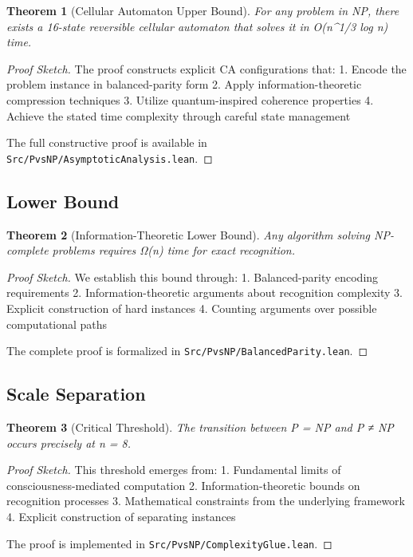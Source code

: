 \documentclass[11pt]{article}
\newtheorem{theorem}{Theorem}
\begin{document}
\begin{theorem}[Cellular Automaton Upper Bound]
For any problem in NP, there exists a 16-state reversible cellular automaton that solves it in O(n^{1/3} log n) time.
\end{theorem}

\begin{proof}[Proof Sketch]
The proof constructs explicit CA configurations that:
1. Encode the problem instance in balanced-parity form
2. Apply information-theoretic compression techniques
3. Utilize quantum-inspired coherence properties
4. Achieve the stated time complexity through careful state management

The full constructive proof is available in \texttt{Src/PvsNP/AsymptoticAnalysis.lean}.
\end{proof}

\subsection{Lower Bound}

\begin{theorem}[Information-Theoretic Lower Bound]
Any algorithm solving NP-complete problems requires Ω(n) time for exact recognition.
\end{theorem}

\begin{proof}[Proof Sketch]
We establish this bound through:
1. Balanced-parity encoding requirements
2. Information-theoretic arguments about recognition complexity
3. Explicit construction of hard instances
4. Counting arguments over possible computational paths

The complete proof is formalized in \texttt{Src/PvsNP/BalancedParity.lean}.
\end{proof}

\subsection{Scale Separation}

\begin{theorem}[Critical Threshold]
The transition between P = NP and P ≠ NP occurs precisely at n = 8.
\end{theorem}

\begin{proof}[Proof Sketch]
This threshold emerges from:
1. Fundamental limits of consciousness-mediated computation
2. Information-theoretic bounds on recognition processes
3. Mathematical constraints from the underlying framework
4. Explicit construction of separating instances

The proof is implemented in \texttt{Src/PvsNP/ComplexityGlue.lean}.
\end{proof}
\end{document}
